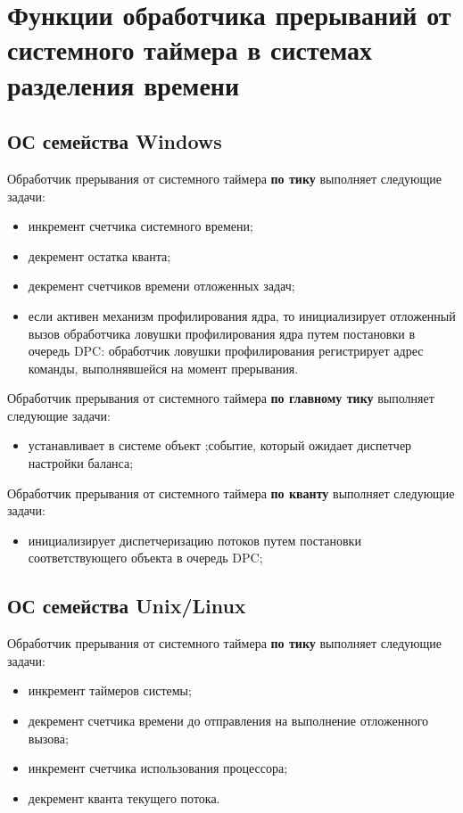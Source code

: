 \chapter{Функции обработчика прерываний от системного таймера в системах разделения времени}
\section{ОС семейства Windows}
Обработчик прерывания от системного таймера \textbf{по тику} выполняет следующие задачи:
\begin{itemize}
	\item инкремент счетчика системного времени;
	\item декремент остатка кванта;
	\item декремент счетчиков времени отложенных задач;
	\item если активен механизм профилирования ядра, то инициализирует отложенный вызов обработчика ловушки профилирования ядра путем постановки в очередь DPC: обработчик ловушки профилирования регистрирует адрес команды, выполнявшейся на момент прерывания.
\end{itemize}

Обработчик прерывания от системного таймера \textbf{по главному тику} выполняет следующие задачи:
\begin{itemize}
	\item устанавливает в системе объект \grqq;событие\grqq, который ожидает диспетчер настройки баланса;
\end{itemize}

Обработчик прерывания от системного таймера \textbf{по кванту} выполняет следующие задачи:
\begin{itemize}
	\item инициализирует диспетчеризацию потоков путем постановки соответствующего объекта в очередь DPC;
\end{itemize}

\section{ОС семейства Unix/Linux}
Обработчик прерывания от системного таймера \textbf{по тику} выполняет следующие задачи:
\begin{itemize}
	\item инкремент таймеров системы;
	\item декремент счетчика времени до отправления на выполнение отложенного вызова;
	\item инкремент счетчика использования процессора;
	\item декремент кванта текущего потока.
\end{itemize}

